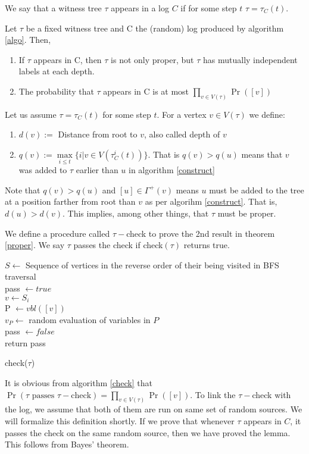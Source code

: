 We say that a witness tree $\tau$ appears in a log $C$ if for some step $t$ $\tau=\tau_C(t)$.

\begin{theorem}
\label{proper}
 Let $\tau$ be a fixed witness tree and  C the (random) log produced by algorithm \ref{algo}. Then,
 \begin{enumerate}
  \item If $\tau$ appears in C, then $\tau $ is not only proper, but $\tau$ has mutually independent labels at each depth.
  \item The probability that $\tau$ appears in C is at most $\prod\limits_{v\in V(\tau)}\Pr([v]) $
 \end{enumerate}
\end{theorem}

\proof Let us assume $\tau = \tau_C(t)$ for some step $t$. For a vertex $v\in  V(\tau )$ we define:
\begin{enumerate} \itemsep -2pt
 \item $d(v) := $ Distance from root to $v$, also called depth of $v$
 \item $q(v) := \max\limits_{i\leq t}\{i|v\in V(\tau_C^{i}(t))\} $. That is $q(v) > q(u)$ means that $v$ was added to $\tau$ earlier than $u$ in algorithm \ref{construct}
\end{enumerate}

Note that $q(v)> q(u) $ and $[u]\in \Gamma^+(v) $ means $u$ must be added to the tree at a position farther from root than $v$ as per algorihm \ref{construct}. That is, $d(u) > d(v) $. This implies, among other things, that $\tau$ must be proper.

We define a procedure called $\tau-$check to prove the 2nd result in theorem \ref{proper}. We say $\tau$ passes the check if check$(\tau)$ returns true.

\begin{algorithm}[H]
 \label{check}
 $S \leftarrow$ Sequence of vertices in the reverse order of their being visited in BFS traversal \\
 pass $\leftarrow true$ \\
  {
	$v\leftarrow S_i $\\
	P $\leftarrow vbl([v]) $ \\
	$v_P \leftarrow $ random evaluation of variables in $P$ \\
	 {
	    pass $\leftarrow false$ \\
	    }
	  }
 return pass
 \caption{check($\tau$)}
\end{algorithm}
It is obvious from algorithm \ref{check} that $\Pr(\tau \text{ passes } \tau-\text{check}) = \prod_{v\in V(\tau) }\Pr([v]) $. To link the $\tau-$check with the log, we assume that both of them are run on same set of random sources. We will formalize this definition shortly. If we prove that whenever $\tau$ appears in $C$, it passes the check on the same random source, then we have proved the lemma. This follows from Bayes' theorem.

